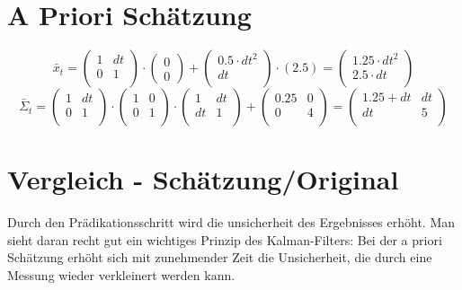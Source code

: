 \documentclass[12pt,a4paper]{article}
\begin{document}
\section{A Priori Schätzung}
\[\bar{x}_t = \begin{pmatrix}
1 & dt \\
0 & 1 \\
\end{pmatrix} \cdot \begin{pmatrix}
0 \\ 0 \end{pmatrix} + \begin{pmatrix}
0.5 \cdot dt^2 \\ dt \\ \end{pmatrix} \cdot (2.5) =
\begin{pmatrix}
1.25 \cdot dt^2 \\
2.5 \cdot dt \\
\end{pmatrix}
\]
\[
\bar{\Sigma}_t = \begin{pmatrix}
1 & dt \\
0 & 1 \\
\end{pmatrix} \cdot \begin{pmatrix}
1 & 0 \\
0 & 1 \\
\end{pmatrix} \cdot \begin{pmatrix}
1 & dt \\
dt & 1 \\
\end{pmatrix} + \begin{pmatrix}
0.25 & 0 \\
0 & 4 \\
\end{pmatrix}  =
\begin{pmatrix}
1.25 + dt & dt \\
dt & 5 \\
\end{pmatrix}
\]

\section{Vergleich - Schätzung/Original}
Durch den Prädikationsschritt wird die unsicherheit des Ergebnisses erhöht. Man sieht daran recht gut ein wichtiges Prinzip des Kalman-Filters: Bei der a priori Schätzung erhöht sich mit zunehmender Zeit die Unsicherheit, die durch eine Messung wieder verkleinert werden kann.
\end{document}
